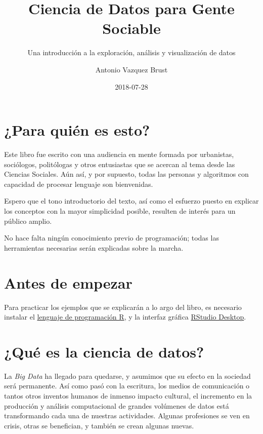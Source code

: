 \documentclass[]{book}
\title{Ciencia de Datos para Gente Sociable}
\subtitle{Una introducción a la exploración, análisis y visualización de datos}
\author{Antonio Vazquez Brust}
\date{2018-07-28}
\begin{document}
\maketitle

{
\setcounter{tocdepth}{1}
\tableofcontents
}
\chapter*{¿Para quién es esto?}\label{para-quien-es-esto}

Este libro fue escrito con una audiencia en mente formada por
urbanistas, sociólogos, politólogas y otros entusiastas que se acercan
al tema desde las Ciencias Sociales. Aún así, y por supuesto, todas las
personas y algoritmos con capacidad de procesar lenguaje son
bienvenidas.

Espero que el tono introductorio del texto, así como el esfuerzo puesto
en explicar los conceptos con la mayor simplicidad posible, resulten de
interés para un público amplio.

No hace falta ningún conocimiento previo de programación; todas las
herramientas necesarias serán explicadas sobre la marcha.

\chapter*{Antes de empezar}\label{antes-de-empezar}

Para practicar los ejemplos que se explicarán a lo argo del libro, es
necesario instalar el \href{https://cloud.r-project.org/}{lenguaje de
programación R}, y la interfaz gráfica
\href{https://www.rstudio.com/products/rstudio/download/}{RStudio
Desktop}.

\chapter{¿Qué es la ciencia de datos?}\label{que-es-la-ciencia-de-datos}

La \emph{Big Data} ha llegado para quedarse, y asumimos que su efecto en
la sociedad será permanente. Así como pasó con la escritura, los medios
de comunicación o tantos otros inventos humanos de inmenso impacto
cultural, el incremento en la producción y análisis computacional de
grandes volúmenes de datos está transformando cada una de nuestras
actividades. Algunas profesiones se ven en crisis, otras se benefician,
y también se crean algunas nuevas.
\end{document}
